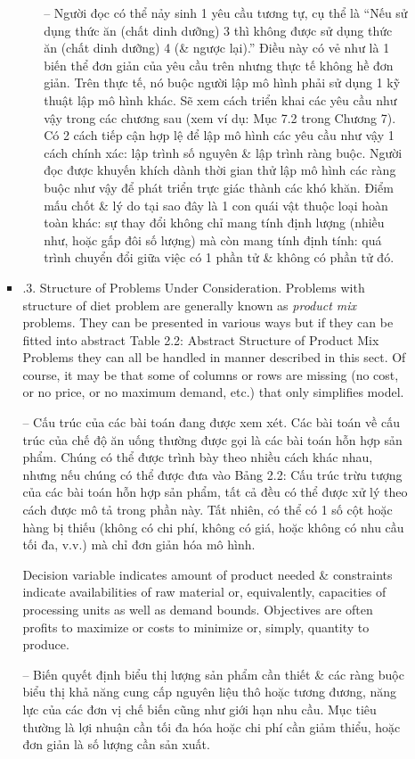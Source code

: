 \documentclass{article}
\begin{document}
\begin{itemize}
\begin{itemize}
\begin{itemize}
\begin{enumerate}
                -- Người đọc có thể nảy sinh 1 yêu cầu tương tự, cụ thể là ``Nếu sử dụng thức ăn (chất dinh dưỡng) 3 thì không được sử dụng thức ăn (chất dinh dưỡng) 4 (\& ngược lại).'' Điều này có vẻ như là 1 biến thể đơn giản của yêu cầu trên nhưng thực tế không hề đơn giản. Trên thực tế, nó buộc người lập mô hình phải sử dụng 1 kỹ thuật lập mô hình khác. Sẽ xem cách triển khai các yêu cầu như vậy trong các chương sau (xem ví dụ: Mục 7.2 trong Chương 7). Có 2 cách tiếp cận hợp lệ để lập mô hình các yêu cầu như vậy 1 cách chính xác: lập trình số nguyên \& lập trình ràng buộc. Người đọc được khuyến khích dành thời gian thử lập mô hình các ràng buộc như vậy để phát triển trực giác thành các khó khăn. Điểm mấu chốt \& lý do tại sao đây là 1 con quái vật thuộc loại hoàn toàn khác: sự thay đổi không chỉ mang tính định lượng (nhiều như, hoặc gấp đôi số lượng) mà còn mang tính định tính: quá trình chuyển đổi giữa việc có 1 phần tử \& không có phần tử đó.
            \end{enumerate}
            \item {.3. Structure of Problems Under Consideration.} Problems with structure of diet problem are generally known as {\it product mix} problems. They can be presented in various ways but if they can be fitted into abstract {\sf Table 2.2: Abstract Structure of Product Mix Problems} they can all be handled in manner described in this sect. Of course, it may be that some of columns or rows are missing (no cost, or no price, or no maximum demand, etc.) that only simplifies model.

            -- {\sf Cấu trúc của các bài toán đang được xem xét.} Các bài toán về cấu trúc của chế độ ăn uống thường được gọi là các bài toán {\sf hỗn hợp sản phẩm}. Chúng có thể được trình bày theo nhiều cách khác nhau, nhưng nếu chúng có thể được đưa vào {\sf Bảng 2.2: Cấu trúc trừu tượng của các bài toán hỗn hợp sản phẩm}, tất cả đều có thể được xử lý theo cách được mô tả trong phần này. Tất nhiên, có thể có 1 số cột hoặc hàng bị thiếu (không có chi phí, không có giá, hoặc không có nhu cầu tối đa, v.v.) mà chỉ đơn giản hóa mô hình.

            Decision variable indicates amount of product needed \& constraints indicate availabilities of raw material or, equivalently, capacities of processing units as well as demand bounds. Objectives are often profits to maximize or costs to minimize or, simply, quantity to produce.

            -- Biến quyết định biểu thị lượng sản phẩm cần thiết \& các ràng buộc biểu thị khả năng cung cấp nguyên liệu thô hoặc tương đương, năng lực của các đơn vị chế biến cũng như giới hạn nhu cầu. Mục tiêu thường là lợi nhuận cần tối đa hóa hoặc chi phí cần giảm thiểu, hoặc đơn giản là số lượng cần sản xuất.


\end{itemize}
\end{itemize}
\end{itemize}
\end{document}
